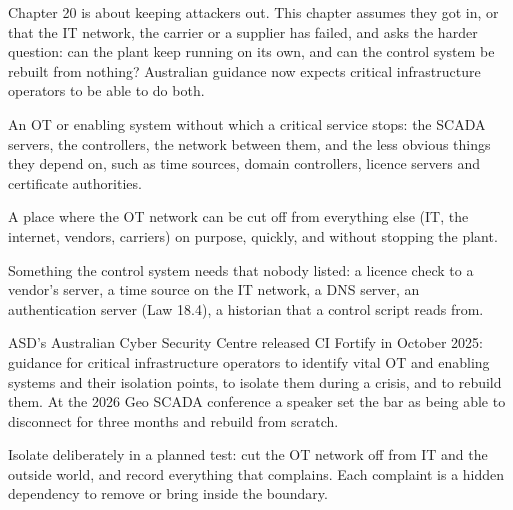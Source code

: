 Chapter 20 is about keeping attackers out. This chapter assumes they got in, or that the IT network, the carrier or a supplier has failed, and asks the harder question: can the plant keep running on its own, and can the control system be rebuilt from nothing? Australian guidance now expects critical infrastructure operators to be able to do both.

 An OT or enabling system without which a critical service stops: the SCADA servers, the controllers, the network between them, and the less obvious things they depend on, such as time sources, domain controllers, licence servers and certificate authorities.

 A place where the OT network can be cut off from everything else (IT, the internet, vendors, carriers) on purpose, quickly, and without stopping the plant.

 Something the control system needs that nobody listed: a licence check to a vendor's server, a time source on the IT network, a DNS server, an authentication server (Law 18.4), a historian that a control script reads from.

 ASD's Australian Cyber Security Centre released CI Fortify in October 2025: guidance for critical infrastructure operators to identify vital OT and enabling systems and their isolation points, to isolate them during a crisis, and to rebuild them. At the 2026 Geo SCADA conference a speaker set the bar as being able to disconnect for three months and rebuild from scratch.

 Isolate deliberately in a planned test: cut the OT network off from IT and the outside world, and record everything that complains. Each complaint is a hidden dependency to remove or bring inside the boundary.

